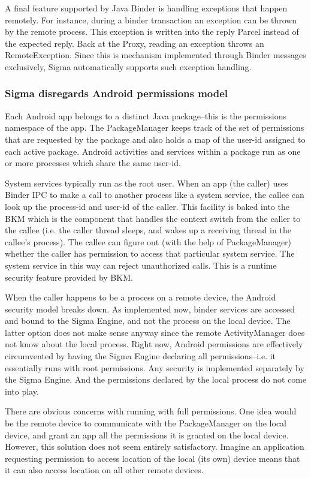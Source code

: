 \documentclass[prodmode]{acmlarge}
\begin{document}
A final feature supported by Java Binder is handling exceptions that happen remotely. For instance, during a binder transaction an exception can be thrown by the remote process. This exception is written into the reply Parcel instead of the expected reply. Back at the Proxy, reading an exception throws an RemoteException. Since this is mechanism implemented through Binder messages exclusively, Sigma automatically supports such exception handling.

\subsubsection{Sigma disregards Android permissions model}
\label{sec:DealingWithAndroidPermissions}
Each Android app belongs to a distinct Java package--this is the permissions namespace of the app. The PackageManager keeps track of the set of permissions that are requested by the package and also holds a map of the user-id assigned to each active package. Android activities and services within a package run as one or more processes which share the same user-id.

System services typically run as the root user. When an app (the caller) uses Binder IPC to make a call to another process like a system service, the callee can look up the process-id and user-id of the caller. This facility is baked into the BKM which is the component that handles the context switch from the caller to the callee (i.e. the caller thread sleeps, and wakes up a receiving thread in the callee's process). The callee can figure out (with the help of PackageManager) whether the caller has permission to access that particular system service. The system service in this way can reject unauthorized calls. This is a runtime security feature provided by BKM.

When the caller happens to be a process on a remote device, the Android security model breaks down. As implemented now, binder services are accessed and bound to the Sigma Engine, and not the process on the local device. The latter option does not make sense anyway since the remote ActivityManager does not know about the local process. Right now, Android permissions are effectively circumvented by having the Sigma Engine declaring all permissions--i.e. it essentially runs with root permissions. Any security is implemented separately by the Sigma Engine. And the permissions declared by the local process do not come into play.

There are obvious concerns with running with full permissions. One idea would be the remote device to communicate with the PackageManager on the local device, and grant an app all the permissions it is granted on the local device. However, this solution does not seem entirely satisfactory. Imagine an application requesting permission to access location of the local (its own) device means that it can also access location on all other remote devices.
\end{document}
